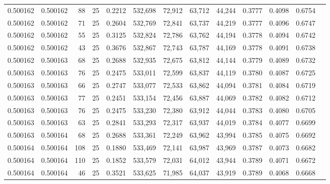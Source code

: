 \begin{tabular}{rrrrrrrrrrrrr}
0.500162 & 0.500162 &    88 &  25 &                                     0.2212 & 532,698 &  72,912 &  63,712 &  44,244 & 0.3777 & 0.4098 & 0.6754 \\
0.500162 & 0.500162 &    71 &  25 &                                     0.2604 & 532,769 &  72,841 &  63,737 &  44,219 & 0.3777 & 0.4096 & 0.6747 \\
0.500162 & 0.500162 &    55 &  25 &                                     0.3125 & 532,824 &  72,786 &  63,762 &  44,194 & 0.3778 & 0.4094 & 0.6742 \\
0.500162 & 0.500162 &    43 &  25 &                                     0.3676 & 532,867 &  72,743 &  63,787 &  44,169 & 0.3778 & 0.4091 & 0.6738 \\
0.500162 & 0.500163 &    68 &  25 &                                     0.2688 & 532,935 &  72,675 &  63,812 &  44,144 & 0.3779 & 0.4089 & 0.6732 \\
0.500163 & 0.500163 &    76 &  25 &                                     0.2475 & 533,011 &  72,599 &  63,837 &  44,119 & 0.3780 & 0.4087 & 0.6725 \\
0.500163 & 0.500163 &    66 &  25 &                                     0.2747 & 533,077 &  72,533 &  63,862 &  44,094 & 0.3781 & 0.4084 & 0.6719 \\
0.500163 & 0.500163 &    77 &  25 &                                     0.2451 & 533,154 &  72,456 &  63,887 &  44,069 & 0.3782 & 0.4082 & 0.6712 \\
0.500163 & 0.500163 &    76 &  25 &                                     0.2475 & 533,230 &  72,380 &  63,912 &  44,044 & 0.3783 & 0.4080 & 0.6705 \\
0.500163 & 0.500163 &    63 &  25 &                                     0.2841 & 533,293 &  72,317 &  63,937 &  44,019 & 0.3784 & 0.4077 & 0.6699 \\
0.500163 & 0.500164 &    68 &  25 &                                     0.2688 & 533,361 &  72,249 &  63,962 &  43,994 & 0.3785 & 0.4075 & 0.6692 \\
0.500164 & 0.500164 &   108 &  25 &                                     0.1880 & 533,469 &  72,141 &  63,987 &  43,969 & 0.3787 & 0.4073 & 0.6682 \\
0.500164 & 0.500164 &   110 &  25 &                                     0.1852 & 533,579 &  72,031 &  64,012 &  43,944 & 0.3789 & 0.4071 & 0.6672 \\
0.500164 & 0.500164 &    46 &  25 &                                     0.3521 & 533,625 &  71,985 &  64,037 &  43,919 & 0.3789 & 0.4068 & 0.6668 \\

\end{tabular}
